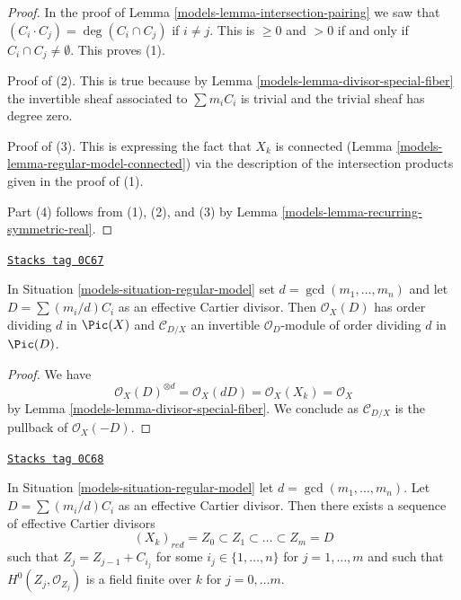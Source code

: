 \begin{proof}

In the proof of Lemma \ref{models-lemma-intersection-pairing} we saw that
$(C_i \cdot C_j) = \deg(C_i \cap C_j)$ if $i \not = j$. This is
$\geq 0$ and $> 0 $ if and only if $C_i \cap C_j \not = \emptyset$.
This proves (1).

\medskip\noindent
Proof of (2). This is true because by Lemma \ref{models-lemma-divisor-special-fiber}
the invertible sheaf associated to $\sum m_i C_i$
is trivial and the trivial sheaf has degree zero.

\medskip\noindent
Proof of (3). This is expressing the fact that $X_k$ is connected
(Lemma \ref{models-lemma-regular-model-connected})
via the description of the intersection products given in the proof of (1).

\medskip\noindent
Part (4) follows from (1), (2), and (3) by
Lemma \ref{models-lemma-recurring-symmetric-real}.
\end{proof}

\begin{lemma}
\label{models-lemma-multiple-fibre-normal-bundle}
\href{https://stacks.math.columbia.edu/tag/0C67}{\texttt{Stacks tag 0C67}}

In Situation \ref{models-situation-regular-model} set $d = \gcd(m_1, \ldots, m_n)$
and let $D = \sum (m_i/d)C_i$ as an effective Cartier divisor.
Then $\mathcal{O}_X(D)$ has order dividing $d$ in $\Pic(X)$
and $\mathcal{C}_{D/X}$ an invertible $\mathcal{O}_D$-module
of order dividing $d$ in $\Pic(D)$.
\end{lemma}

\begin{proof}

We have
$$
\mathcal{O}_X(D)^{\otimes d} = \mathcal{O}_X(dD) =
\mathcal{O}_X(X_k) = \mathcal{O}_X
$$
by Lemma \ref{models-lemma-divisor-special-fiber}.
We conclude as $\mathcal{C}_{D/X}$ is the pullback of
$\mathcal{O}_X(-D)$.
\end{proof}

\begin{lemma}
\label{models-lemma-regular-model-field}
\href{https://stacks.math.columbia.edu/tag/0C68}{\texttt{Stacks tag 0C68}}

\begin{reference}
\cite[Lemma 2.6]{Artin-Winters}
\end{reference}
In Situation \ref{models-situation-regular-model} let $d = \gcd(m_1, \ldots, m_n)$.
Let $D = \sum (m_i/d) C_i$ as an effective Cartier divisor. Then there exists
a sequence of effective Cartier divisors
$$
(X_k)_{red} = Z_0 \subset Z_1 \subset \ldots \subset Z_m = D
$$
such that $Z_j = Z_{j - 1} + C_{i_j}$ for some $i_j \in \{1, \ldots, n\}$
for $j = 1, \ldots, m$ and such that $H^0(Z_j, \mathcal{O}_{Z_j})$
is a field finite over $k$ for $j = 0, \ldots m$.
\end{lemma}

